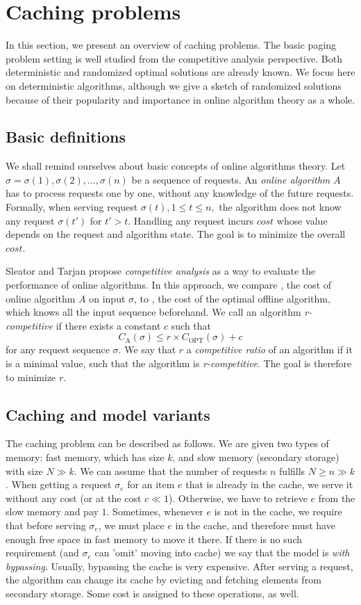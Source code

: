 \section{Caching problems}
\label{caching_problems}
In this section, we present an overview of caching problems. The basic paging 
problem setting is well studied from the competitive analysis perspective. 
Both deterministic and randomized optimal solutions are already known. We focus 
here on deterministic algorithms, although we give a sketch of randomized solutions 
because of their popularity and importance in online algorithm theory as a 
whole. 
\subsection{Basic definitions}
We shall remind ourselves about basic concepts of online algorithms theory. 
Let $\sigma = \sigma(1), \sigma(2), \ldots, \sigma(n)$ be a sequence of 
requests. An \textit{online algorithm} $A$ has to process requests one by one, 
without any knowledge of the future requests. Formally, when 
serving request 
$\sigma(t), 1 \leq t \leq n,$ the algorithm does not know any request 
$\sigma(t')$ for $t'>t$. Handling any request incurs $cost$ whose value  
depends on the request and algorithm state. The goal is to minimize the overall 
$cost$.

Sleator and Tarjan \cite{tarjan} propose
\textit{competitive analysis} as a way to evaluate the performance of online 
algorithms. In this approach, we compare , the cost of online algorithm 
$A$ on input $\sigma$, to , the cost of the optimal offline algorithm, 
which knows all the input sequence beforehand. We call an algorithm 
\textit{r-competitive} if there exists a constant $c$ such that
$$C_{\mathrm{A}}(\sigma) \leq r \times C_{\mathrm{OPT}}(\sigma) + c$$
for any request sequence $\sigma$. We say that $r$ a \textit{competitive ratio}
of an algorithm if it is a minimal value, such that the algorithm is 
\textit{r-competitive}. The goal is therefore to minimize $r$.

\subsection{Caching and model variants}
The caching problem can be described as follows. We are given two types of memory: 
fast memory, which has size $k$, and slow memory (secondary storage) with size $N 
\gg k$. We can 
assume that the number of requests $n$ fulfills $N \geq n \gg k$. When getting a 
request $\sigma_{e}$ for an item $e$ that is already in the cache, we serve it 
without any cost (or at the cost $c \ll 1$). 
Otherwise, we have to retrieve $e$ from the slow memory and pay 
$1$. Sometimes, whenever $e$ is not in the cache, we require that before 
serving $\sigma_{e}$, we must place $e$ in the cache, and therefore must have 
enough free space in fast memory to move it there. If there is no such requirement 
(and $\sigma_{e}$ can 'omit' moving into cache) we say that the model is 
\textit{with bypassing}. Usually, bypassing the cache is very expensive. After serving 
a request, the algorithm can change its cache by evicting and fetching elements 
from secondary storage. Some cost is assigned to these operations, as well.

